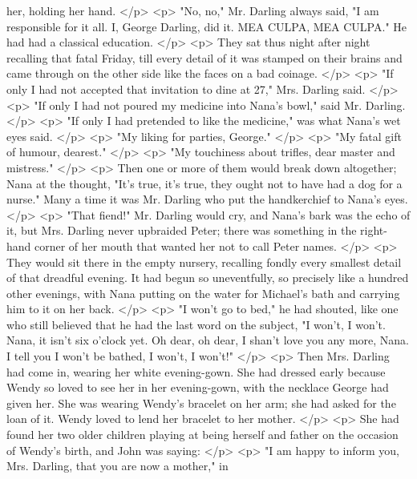       her, holding her hand.
    </p>
    <p>
      "No, no," Mr. Darling always said, "I am responsible for it all. I, George
      Darling, did it. MEA CULPA, MEA CULPA." He had had a classical education.
    </p>
    <p>
      They sat thus night after night recalling that fatal Friday, till every
      detail of it was stamped on their brains and came through on the other
      side like the faces on a bad coinage.
    </p>
    <p>
      "If only I had not accepted that invitation to dine at 27," Mrs. Darling
      said.
    </p>
    <p>
      "If only I had not poured my medicine into Nana's bowl," said Mr. Darling.
    </p>
    <p>
      "If only I had pretended to like the medicine," was what Nana's wet eyes
      said.
    </p>
    <p>
      "My liking for parties, George."
    </p>
    <p>
      "My fatal gift of humour, dearest."
    </p>
    <p>
      "My touchiness about trifles, dear master and mistress."
    </p>
    <p>
      Then one or more of them would break down altogether; Nana at the thought,
      "It's true, it's true, they ought not to have had a dog for a nurse." Many
      a time it was Mr. Darling who put the handkerchief to Nana's eyes.
    </p>
    <p>
      "That fiend!" Mr. Darling would cry, and Nana's bark was the echo of it,
      but Mrs. Darling never upbraided Peter; there was something in the
      right-hand corner of her mouth that wanted her not to call Peter names.
    </p>
    <p>
      They would sit there in the empty nursery, recalling fondly every smallest
      detail of that dreadful evening. It had begun so uneventfully, so
      precisely like a hundred other evenings, with Nana putting on the water
      for Michael's bath and carrying him to it on her back.
    </p>
    <p>
      "I won't go to bed," he had shouted, like one who still believed that he
      had the last word on the subject, "I won't, I won't. Nana, it isn't six
      o'clock yet. Oh dear, oh dear, I shan't love you any more, Nana. I tell
      you I won't be bathed, I won't, I won't!"
    </p>
    <p>
      Then Mrs. Darling had come in, wearing her white evening-gown. She had
      dressed early because Wendy so loved to see her in her evening-gown, with
      the necklace George had given her. She was wearing Wendy's bracelet on her
      arm; she had asked for the loan of it. Wendy loved to lend her bracelet to
      her mother.
    </p>
    <p>
      She had found her two older children playing at being herself and father
      on the occasion of Wendy's birth, and John was saying:
    </p>
    <p>
      "I am happy to inform you, Mrs. Darling, that you are now a mother," in
